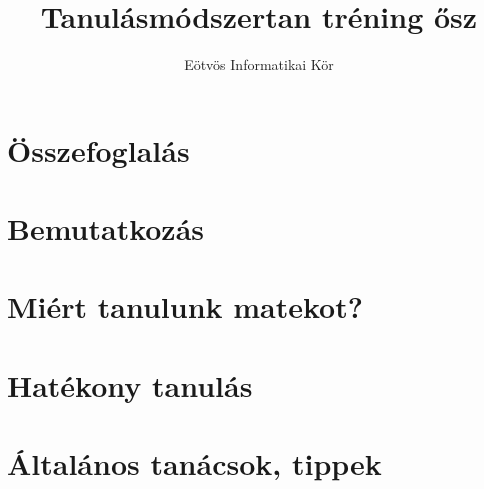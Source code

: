 \documentclass[12pt]{article}
\title{Tanulásmódszertan tréning ősz}
\author{Eötvös Informatikai Kör}
\date{ }
\begin{document}


\section{Összefoglalás}


\section{Bemutatkozás}


\section{Miért tanulunk matekot?}


\section{Hatékony tanulás}


\section{Általános tanácsok, tippek}

\end{document}

